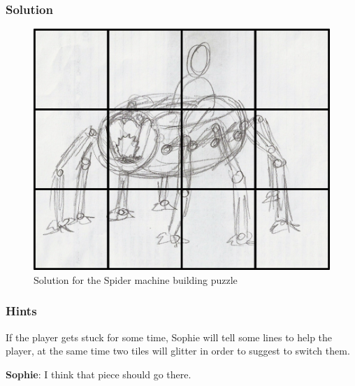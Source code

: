 \subsubsection*{Solution}
\begin{figure}[H]
  \centering
  \includegraphics[width=\textwidth]{Images/Puzzles/castleOfDynamia1Solution}
  \caption{Solution for the Spider machine building puzzle}
\end{figure}


\subsubsection*{Hints}
If the player gets stuck for some time, Sophie will tell some lines to help the player, at the same time two tiles will glitter in order to suggest to switch them.

\textbf{Sophie}: I think that piece should go there.

